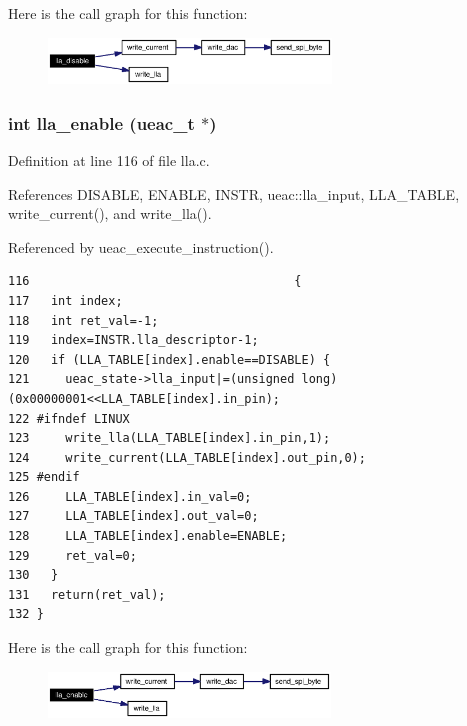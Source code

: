 Here is the call graph for this function:\begin{figure}[H]
\begin{center}
\leavevmode
\includegraphics[width=213pt]{lla_8h_a5_cgraph}
\end{center}
\end{figure}
\subsubsection{\setlength{\rightskip}{0pt plus 5cm}int lla\_\-enable ({\bf ueac\_\-t} $\ast$)}\label{lla_8h_a6}




Definition at line 116 of file lla.c.

References DISABLE, ENABLE, INSTR, ueac::lla\_\-input, LLA\_\-TABLE, write\_\-current(), and write\_\-lla().

Referenced by ueac\_\-execute\_\-instruction().

\footnotesize\begin{verbatim}116                                     {
117   int index;
118   int ret_val=-1;
119   index=INSTR.lla_descriptor-1;
120   if (LLA_TABLE[index].enable==DISABLE) {
121     ueac_state->lla_input|=(unsigned long)(0x00000001<<LLA_TABLE[index].in_pin);
122 #ifndef LINUX
123     write_lla(LLA_TABLE[index].in_pin,1);
124     write_current(LLA_TABLE[index].out_pin,0);
125 #endif 
126     LLA_TABLE[index].in_val=0;
127     LLA_TABLE[index].out_val=0;
128     LLA_TABLE[index].enable=ENABLE;
129     ret_val=0;
130   }
131   return(ret_val);
132 }
\end{verbatim}\normalsize 




Here is the call graph for this function:\begin{figure}[H]
\begin{center}
\leavevmode
\includegraphics[width=212pt]{lla_8h_a6_cgraph}
\end{center}
\end{figure}

